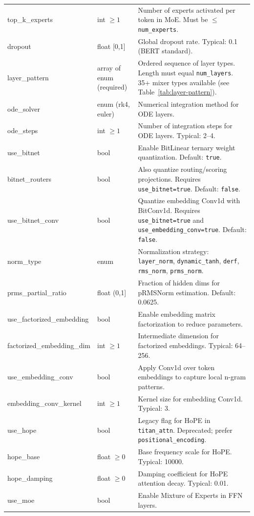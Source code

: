 \begin{longtable}{>{\ttfamily}l>{\raggedright\arraybackslash}p{3.5cm}>{\raggedright\arraybackslash}p{8.5cm}}
top\_k\_experts & int $\ge 1$ & Number of experts activated per token in MoE. Must be $\le$ \texttt{num\_experts}. \\
dropout & float [0,1] & Global dropout rate. Typical: 0.1 (BERT standard). \\
layer\_pattern & array of enum (required) & Ordered sequence of layer types. Length must equal \texttt{num\_layers}. 35+ mixer types available (see Table~\ref{tab:layer-pattern}). \\
ode\_solver & enum (rk4, euler) & Numerical integration method for ODE layers. \\
ode\_steps & int $\ge 1$ & Number of integration steps for ODE layers. Typical: 2--4. \\
use\_bitnet & bool & Enable BitLinear ternary weight quantization. Default: \texttt{true}. \\
bitnet\_routers & bool & Also quantize routing/scoring projections. Requires \texttt{use\_bitnet=true}. Default: \texttt{false}. \\
use\_bitnet\_conv & bool & Quantize embedding Conv1d with BitConv1d. Requires \texttt{use\_bitnet=true} and \texttt{use\_embedding\_conv=true}. Default: \texttt{false}. \\
norm\_type & enum & Normalization strategy: \texttt{layer\_norm}, \texttt{dynamic\_tanh}, \texttt{derf}, \texttt{rms\_norm}, \texttt{prms\_norm}. \\
prms\_partial\_ratio & float (0,1] & Fraction of hidden dims for pRMSNorm estimation. Default: 0.0625. \\
use\_factorized\_embedding & bool & Enable embedding matrix factorization to reduce parameters. \\
factorized\_embedding\_dim & int $\ge 1$ & Intermediate dimension for factorized embeddings. Typical: 64--256. \\
use\_embedding\_conv & bool & Apply Conv1d over token embeddings to capture local n-gram patterns. \\
embedding\_conv\_kernel & int $\ge 1$ & Kernel size for embedding Conv1d. Typical: 3. \\
use\_hope & bool & Legacy flag for HoPE in \texttt{titan\_attn}. Deprecated; prefer \texttt{positional\_encoding}. \\
hope\_base & float $\ge 0$ & Base frequency scale for HoPE. Typical: 10000. \\
hope\_damping & float $\ge 0$ & Damping coefficient for HoPE attention decay. Typical: 0.01. \\
use\_moe & bool & Enable Mixture of Experts in FFN layers. \\

\end{longtable}

